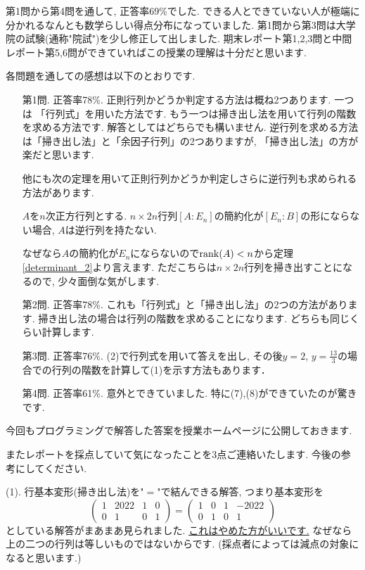 \documentclass[dvipdfmx,a4paper,11pt]{article}
\theoremstyle{definition}
\begin{document}
 \hspace{-11pt}{\LARGE 期末レポートについて.}

第1問から第4問を通して, 正答率69\%でした. できる人とできていない人が極端に分かれるなんとも数学らしい得点分布になっていました. 
第1問から第3問は大学院の試験(通称"院試")を少し修正して出しました. 期末レポート第1,2,3問と中間レポート第5,6問ができていればこの授業の理解は十分だと思います.

各問題を通しての感想は以下のとおりです.
\begin{itemize}
\item [第1問.] 正答率78\%. 正則行列かどうか判定する方法は概ね2つあります. 一つは 「行列式」を用いた方法です.  もう一つは掃き出し法を用いて行列の階数を求める方法です. 解答としてはどちらでも構いません. 
逆行列を求める方法は「掃き出し法」と「余因子行列」の2つありますが, 「掃き出し法」の方が楽だと思います.

他にも次の定理を用いて正則行列かどうか判定しさらに逆行列も求められる方法があります.
 \begin{tcolorbox}[
    colback = white,
    colframe = green!35!black,
    fonttitle = \bfseries,
    breakable = true]
$A$を$n$次正方行列とする. $n \times 2n$行列$[A : E_n]$の簡約化が$[E_n : B]$の形にならない場合, $A$は逆行列を持たない.
 \end{tcolorbox}
 なぜなら$A$の簡約化が$E_n$にならないので$\rank(A) <n$から定理\ref{determinant_2}より言えます. ただこちらは$n \times 2n$行列を掃き出すことになるので, 少々面倒な気がします. 
\item [第2問.] 正答率78\%. これも「行列式」と「掃き出し法」の2つの方法があります. 掃き出し法の場合は行列の階数を求めることになります. どちらも同じくらい計算します.
\item [第3問.] 正答率76\%. (2)で行列式を用いて答えを出し, その後$y=2$, $y=\frac{13}{3}$の場合での行列の階数を計算して(1)を示す方法もあります．
\item [第4問.] 正答率61\%. 意外とできていました. 特に(7),(8)ができていたのが驚きです. 
\end{itemize}

今回もプログラミングで解答した答案を授業ホームページに公開しておきます. 

またレポートを採点していて気になったことを3点ご連絡いたします. 今後の参考にしてください.

(1). 行基本変形(掃き出し法)を"$=$"で結んできる解答, つまり基本変形を
 $$
 \begin{pmatrix}
1& 2022 &1 & 0 \\
0& 1& 0& 1
 \end{pmatrix}
=
  \begin{pmatrix}
1& 0 &1 & -2022 \\
0& 1& 0& 1
 \end{pmatrix}
 $$
 としている解答がまあまあ見られました. \underline{これはやめた方がいいです.}
 なぜなら上の二つの行列は等しいものではないからです. 
 (採点者によっては減点の対象になると思います.)
 
\end{document}
